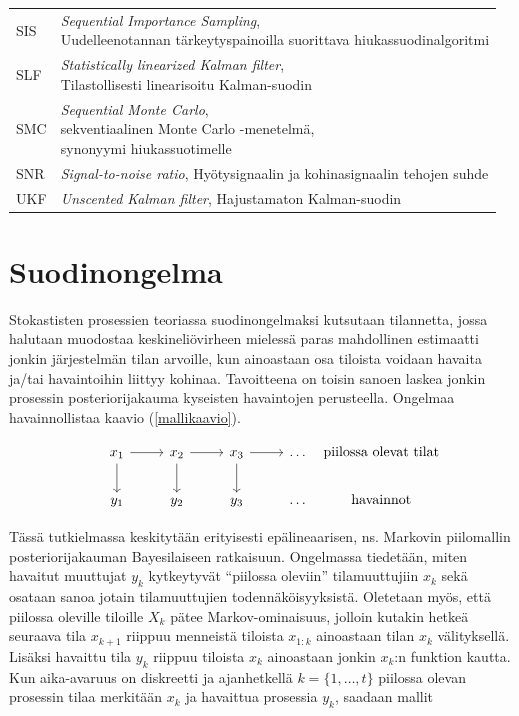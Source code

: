 \documentclass[
  12pt,
  a4paper, twoside]{book}
\begin{document}
\begin{table}
\begin{tabular}[t]{ll}
\addlinespace
SIS & \makecell[l]{\textit{Sequential Importance Sampling},\\Uudelleenotannan tärkeytyspainoilla suorittava hiukassuodinalgoritmi}\\
SLF & \makecell[l]{\textit{Statistically linearized Kalman filter},\\Tilastollisesti linearisoitu Kalman-suodin}\\
SMC & \makecell[l]{\textit{Sequential Monte Carlo}, \\sekventiaalinen Monte Carlo -menetelmä, \\synonyymi hiukassuotimelle}\\
SNR & \textit{Signal-to-noise ratio}, Hyötysignaalin ja kohinasignaalin tehojen suhde\\
UKF & \textit{Unscented Kalman filter}, Hajustamaton Kalman-suodin\\
\bottomrule
\end{tabular}
\end{table}

\section{Suodinongelma}

Stokastisten prosessien teoriassa suodinongelmaksi kutsutaan tilannetta, jossa halutaan muodostaa keskineliövirheen mielessä paras mahdollinen estimaatti jonkin järjestelmän tilan arvoille, kun ainoastaan osa tiloista voidaan havaita ja/tai havaintoihin liittyy kohinaa. Tavoitteena on toisin sanoen laskea jonkin prosessin posteriorijakauma kyseisten havaintojen perusteella. Ongelmaa havainnollistaa kaavio (\ref{mallikaavio}).

\begin{equation}\label{mallikaavio}
\begin{tikzcd}
x_1 \arrow[d] \arrow[r] & x_2 \arrow[d] \arrow[r] & x_3 \arrow[d] \arrow[r] & \ldots & \makebox[\widthof{$ \text{havainnot}$}]{$\text{piilossa olevat tilat}$} \\
y_1  & y_2  & y_3  & \ldots & \makebox[\widthof{$ \text{havainnot}$}]{$\text{havainnot}$}
\end{tikzcd}
\end{equation}

Tässä tutkielmassa keskitytään erityisesti epälineaarisen, ns. Markovin piilomallin posteriorijakauman Bayesilaiseen ratkaisuun. Ongelmassa tiedetään, miten havaitut muuttujat \(y_k\) kytkeytyvät ``piilossa oleviin'' tilamuuttujiin \(x_k\) sekä osataan sanoa jotain tilamuuttujien todennäköisyyksistä. Oletetaan myös, että piilossa oleville tiloille \(X_k\) pätee Markov-ominaisuus, jolloin kutakin hetkeä seuraava tila \(x_{k+1}\) riippuu menneistä tiloista \(x_{1:k}\) ainoastaan tilan \(x_k\) välityksellä. Lisäksi havaittu tila \(y_k\) riippuu tiloista \(x_{k}\) ainoastaan jonkin \(x_k\):n funktion kautta. Kun aika-avaruus on diskreetti ja ajanhetkellä \(k=\{1,\ldots,t\}\) piilossa olevan prosessin tilaa merkitään \(x_k\) ja havaittua prosessia \(y_k\), saadaan mallit
\end{document}
